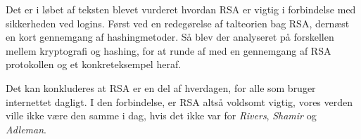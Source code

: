 Det er i løbet af teksten blevet vurderet hvordan RSA er vigtig i forbindelse med sikkerheden ved logins.
Først ved en redegørelse af talteorien bag RSA, dernæst en kort gennemgang af hashingmetoder.
Så blev der analyseret på forskellen mellem kryptografi og hashing, for at runde af med en gennemgang af RSA protokollen og et konkreteksempel heraf.
\par
Det kan konkluderes at RSA er en del af hverdagen, for alle som bruger internettet dagligt.
I den forbindelse, er RSA altså voldsomt vigtig, vores verden ville ikke være den samme i dag, hvis det ikke var for \textit{Rivers}, \textit{Shamir} og \textit{Adleman}.


